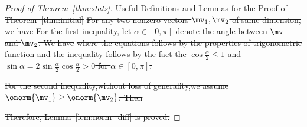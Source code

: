 \documentclass[lettersize,onecolumn,journal]{IEEEtran}
\theoremstyle{definition}
\newtheorem{lem}{Lemma}
\theoremstyle{definition}
\providecommand{\DIFdeltex}[1]{{\protect\color{red}\sout{#1}}}                      %
\providecommand{\DIFdel}[1]{\texorpdfstring{\DIFdeltex{#1}}{}} %
\begin{document}
\begin{proof}[Proof of Theorem~\ref{thm:stats}]
\DIFdel{Useful Definitions and Lemmas for the Proof of Theorem~\ref{thm:initial}}%
\DIFdel{For any two nonzero vectors $\mv_1,\mv_2$ of same dimension, we have 
}%
\DIFdel{For the first inequality, let $\alpha \in [0,\pi]$ denote the angle between $\mv_1$ and $\mv_2$. We have 
}%
\DIFdel{where the equations follows by the properties of trigonometric function and the inequality follows by the fact the $\cos \frac{\alpha}{2} \leq 1$ and $\sin \alpha = 2 \sin \frac{\alpha}{2} \cos \frac{\alpha}{2} > 0$ for $\alpha \in [0, \pi]$. 
}%

\DIFdel{For the second inequality,without loss of generality,we assume $\onorm{\mv_1}\geq \onorm{\mv_2}$. Then
}%

\DIFdel{Therefore, Lemma~\ref{lem:norm_diff} is proved.
}%


\end{proof}
\end{document}
